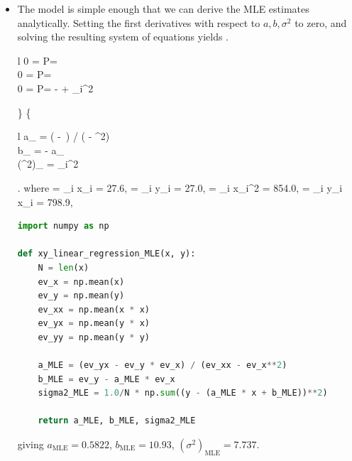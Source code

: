\begin{itemize}
		\ee
	\item The model is simple enough that we can derive the MLE estimates analytically. Setting the first derivatives with respect to $a, b, \sigma^2$ to zero, and solving the resulting system of equations yields
		\be
			\left.
				\begin{array}{l}
				0 =  \log P\s = 
				\\
				0 =  \log P\s = 
				\\
				0 =  \log P\s = - +  \sum_i\Big[y_i - (ax_i + b)\Big]^2
				\end{array}
			\right\}
			\Rightarrow
			\left\{
				\begin{array}{l}
				a_ = \big( - \,\big) / \big( - \overline{x}^2\big)
				\\
				b_ =  - a_\,\overline{x}
				\\
				(\sigma^2)_ = \sum_i\big[y_i - (a_\text{MLE}\,x_i + b_\text{MLE})\big]^2
				\end{array}
			\right.
		\ee
		where
		\be
			 = \sum_i x_i = 27.6,\qquad 
			 = \sum_i y_i = 27.0,\qquad
			 = \sum_i x_i^2 = 854.0,\qquad
			 = \sum_i y_i x_i = 798.9,\qquad
		\ee
\begin{lstlisting}[language=python]
import numpy as np

def xy_linear_regression_MLE(x, y):
    N = len(x)
    ev_x = np.mean(x)
    ev_y = np.mean(y)
    ev_xx = np.mean(x * x)
    ev_yx = np.mean(y * x)
    ev_yy = np.mean(y * y)

    a_MLE = (ev_yx - ev_y * ev_x) / (ev_xx - ev_x**2)
    b_MLE = ev_y - a_MLE * ev_x
    sigma2_MLE = 1.0/N * np.sum((y - (a_MLE * x + b_MLE))**2)
    
    return a_MLE, b_MLE, sigma2_MLE
\end{lstlisting}
		giving $a_\text{MLE} = 0.5822$, \quad $b_\text{MLE} = 10.93$, \quad  $(\sigma^2)_\text{MLE} = 7.737$.


\end{itemize}
